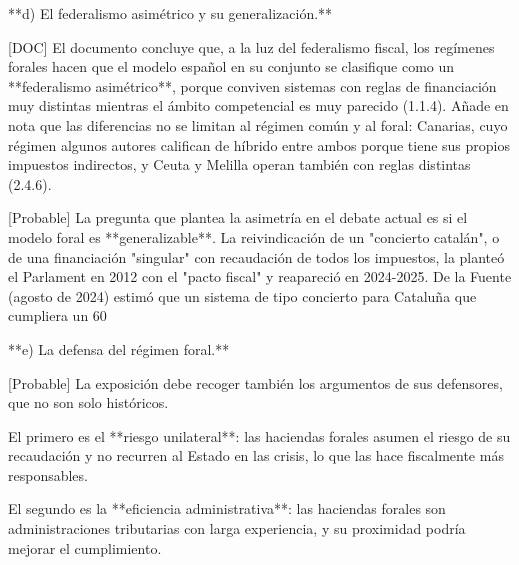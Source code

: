 \documentclass[10pt,a4paper]{article}
\begin{document}
**d) El federalismo asimétrico y su generalización.**

[DOC] El documento concluye que, a la luz del federalismo fiscal, los regímenes forales hacen que el modelo español en su conjunto se clasifique como un **federalismo asimétrico**, porque conviven sistemas con reglas de financiación muy distintas mientras el ámbito competencial es muy parecido (1.1.4). Añade en nota que las diferencias no se limitan al régimen común y al foral: Canarias, cuyo régimen algunos autores califican de híbrido entre ambos porque tiene sus propios impuestos indirectos, y Ceuta y Melilla operan también con reglas distintas (2.4.6).

[Probable] La pregunta que plantea la asimetría en el debate actual es si el modelo foral es **generalizable**. La reivindicación de un "concierto catalán", o de una financiación "singular" con recaudación de todos los impuestos, la planteó el Parlament en 2012 con el "pacto fiscal" y reapareció en 2024-2025. De la Fuente (agosto de 2024) estimó que un sistema de tipo concierto para Cataluña que cumpliera un 60%

**e) La defensa del régimen foral.**

[Probable] La exposición debe recoger también los argumentos de sus defensores, que no son solo históricos.

El primero es el **riesgo unilateral**: las haciendas forales asumen el riesgo de su recaudación y no recurren al Estado en las crisis, lo que las hace fiscalmente más responsables.

El segundo es la **eficiencia administrativa**: las haciendas forales son administraciones tributarias con larga experiencia, y su proximidad podría mejorar el cumplimiento.
\end{document}
